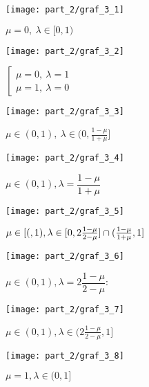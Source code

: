 \begin{figure}[H]
	\centering
	\begin{subfigure}[b]{0.3 \textwidth}
		\texttt{[image: part\_2/graf\_3\_1]}
		\caption{$\mu = 0, \: \lambda \in [0, 1)$}
	\end{subfigure}
	\begin{subfigure}[b]{0.3 \textwidth}
		\texttt{[image: part\_2/graf\_3\_2]}
		\caption{
			$
			\left[
			\begin{array}{c}
     			\mu=0, \: \lambda = 1 \\
     			\mu=1, \: \lambda = 0
  			\end{array}
			\right.
			$
		}
	\end{subfigure}
	\begin{subfigure}[b]{0.3 \textwidth}	
		\texttt{[image: part\_2/graf\_3\_3]}
		\caption{
			$
				\mu \in (0,1), \:
				\lambda \in (0, \frac{1 - \mu}{1 + \mu}]
			$		
		}
	\end{subfigure}
	\newline	
	\centering
	\begin{subfigure}[b]{0.3 \textwidth}
		\texttt{[image: part\_2/graf\_3\_4]}
		\caption{
			$\mu \in (0,1), \lambda = \dfrac{1-\mu}{1+\mu}$		
		}
	\end{subfigure}
	\begin{subfigure}[b]{0.3 \textwidth}
		\texttt{[image: part\_2/graf\_3\_5]}
		\caption{
			$\mu \in [(, 1), \newline 
			\lambda \in 
			[0, 2\frac{1 - \mu}{2 - \mu}] \cap 
			(\frac{1 - \mu}{1 + \mu}, 1]$
		}
	\end{subfigure}
	\begin{subfigure}[b]{0.3 \textwidth}	
		\texttt{[image: part\_2/graf\_3\_6]}
		\caption{
			$\mu \in (0, 1), \lambda = 2\dfrac{1 - \mu}{2 - \mu}$: 
		}
	\end{subfigure}
	\newline
	\begin{subfigure}[b]{0.3 \textwidth}
		\texttt{[image: part\_2/graf\_3\_7]}
		\caption{
			$\mu \in (0, 1), 
			\lambda \in (2\frac{1 - \mu}{2 - \mu}, 1]$		
		}
	\end{subfigure}
	\begin{subfigure}[b]{0.3 \textwidth}
		\texttt{[image: part\_2/graf\_3\_8]}
		\caption{
			$\mu = 1, \lambda \in (0, 1] $		
		}
	\end{subfigure}
	\caption{}
\end{figure}